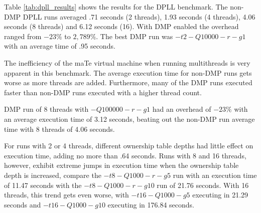 Table \ref{tab:dpll_results} shows the results for the DPLL benchmark.
The non-DMP DPLL runs averaged .71 seconds (2 threads), 1.93 seconds
(4 threads), 4.06 seconds (8 threads) and 6.12 seconds (16).  With DMP
enabled the overhead ranged from $-23\%$ to $2,789\%$.  The best DMP
run was $-t2 -Q10000 -r -g1$ with an average time of .95 seconds.

The inefficiency of the maTe virtual machine when running multithreads
is very apparent in this benchmark.  The average execution time for
non-DMP runs gets worse as more threads are added.  Furthermore, many
of the DMP runs executed faster than non-DMP runs executed with a
higher thread count.

DMP run of 8 threads with $-Q100000 -r -g1$ had an overhead of $-23\%$
with an average execution time of 3.12 seconds, beating out the
non-DMP run average time with 8 threads of 4.06 seconds.


For runs with 2 or 4 threads, different ownership table depths had
little effect on execution time, adding no more than .64 seconds.
Runs with 8 and 16 threads, however, exhibit extreme jumps in
execution time when the ownership table depth is increased, compare
the $-t8 -Q1000 -r -g5$ run with an execution time of 11.47 seconds
with the $-t8 -Q1000 -r -g10$ run of 21.76 seconds.  With 16 threads,
this trend gets even worse, with $-t16 -Q1000 -g5$ executing in 21.29
seconds and $-t16 -Q1000 -g10$ executing in 176.84 seconds.



